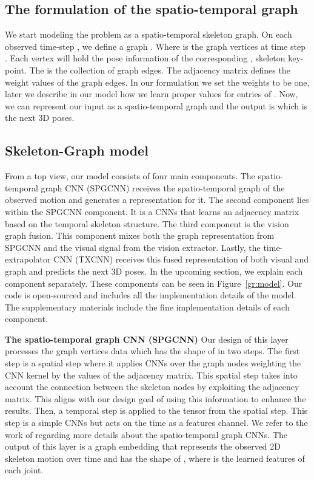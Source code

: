 \documentclass[10pt,twocolumn,letterpaper]{article}
\newcommand*{\ours}{Skeleton-Graph }
\begin{document}
\subsection{The formulation of the spatio-temporal graph}
We start modeling the problem as a spatio-temporal skeleton graph. On each observed time-step ,  we define a graph . Where  is the graph vertices at time step . Each vertex will hold the pose  information of the corresponding ,  skeleton key-point. The  is the collection of graph edges. The adjacency matrix  defines the weight values of the graph edges. In our formulation we set the weights to be one, later we describe in our model how we learn proper values for entries of . 
Now, we can represent our input as a spatio-temporal graph  and the output is  which is the next 3D poses.

\subsection{\ours model}
From a top view, our model consists of four main components. The spatio-temporal graph CNN (SPGCNN) receives the spatio-temporal graph of the observed motion and generates a representation for it. The second component lies within the SPGCNN component. It is a CNNs that learns an adjacency matrix based on the temporal skeleton structure. The third component is the vision graph fusion. This component mixes both the graph representation from SPGCNN and the visual signal from the vision extractor. Lastly, the time-extrapolator CNN (TXCNN) receives this fused representation of both visual and graph and predicts the next 3D poses. In the upcoming section, we explain each component separately. These components can be seen in Figure~\ref{gr:model}. Our code is open-sourced and includes all the implementation details of the model. The supplementary materials include the fine implementation details of each component. 

\textbf{The spatio-temporal graph CNN (SPGCNN)} Our design of this layer processes the graph vertices data which has the shape of  in two steps. The first step is a spatial step where it applies CNNs over the graph nodes weighting the CNN kernel by the values of the adjacency matrix. This spatial step takes into account the connection between the skeleton nodes by exploiting the adjacency matrix. This aligns with our design goal of using this information to enhance the results. Then, a temporal step is applied to the tensor from the spatial step. This step is a simple CNNs but acts on the time  as a features channel. We refer to the work of \cite{yan2018spatial} regarding more details about the spatio-temporal graph CNNs. The output of this layer is a graph embedding that represents the observed 2D skeleton motion over time and has the shape of , where  is the learned features of each joint. 
\end{document}
